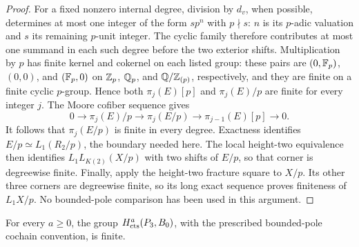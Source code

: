 \begin{proof}
For a fixed nonzero internal degree, division by \(d_v\), when possible,
determines at most one integer of the form \(sp^n\) with \(p\nmid s\):
\(n\) is its \(p\)-adic valuation and \(s\) its remaining \(p\)-unit
integer.  The cyclic family therefore contributes at most one summand
in each such degree before the two exterior shifts.  Multiplication by
\(p\) has finite kernel and cokernel on each listed group: these pairs
are \((0,\mathbb F_p)\), \((0,0)\), and \((\mathbb F_p,0)\) on \(\mathbb Z_p\), \(\mathbb Q_p\),
and \(\mathbb Q/\mathbb Z_{(p)}\), respectively, and they are finite on a finite
cyclic \(p\)-group.  Hence both \(\pi_j(E)[p]\) and \(\pi_j(E)/p\) are
finite for every integer \(j\).  The Moore cofiber sequence gives
\[
 0\longrightarrow\pi_j(E)/p\longrightarrow\pi_j(E/p)
   \longrightarrow\pi_{j-1}(E)[p]\longrightarrow0.
\]
It follows that \(\pi_j(E/p)\) is finite in every degree.  Exactness
identifies \(E/p\simeq L_1(R_2/p)\), the boundary needed here.
The local height-two equivalence then identifies \(L_1L_{K(2)}(X/p)\)
with two shifts of \(E/p\), so that corner is degreewise finite.
Finally, apply the height-two fracture square to \(X/p\).
Its other three corners are degreewise finite, so its long
exact sequence proves finiteness of \(L_1X/p\).
No bounded-pole comparison has been used in this argument.
\end{proof}

\begin{proposition}\label{h3:prop:bounded-pole-finiteness}
For every \(a\geq0\), the group
\(H^a_{\mathrm{cts}}(P_3,B_0)\), with the prescribed bounded-pole
cochain convention, is finite.
\end{proposition}

